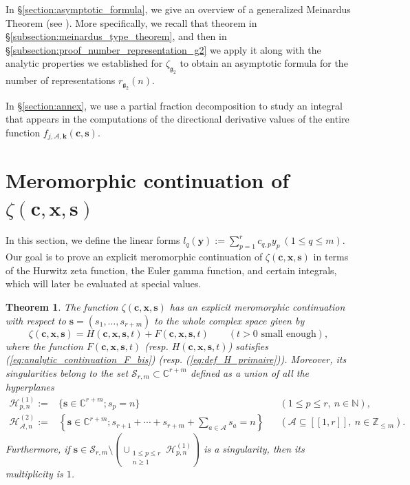 \documentclass[a4paper]{amsart}
\newtheorem{theorem}{Theorem}
\theoremstyle{remark}
\theoremstyle{definition}
\begin{document}
In §\ref{section:asymptotic_formula}, we give an overview of a generalized Meinardus Theorem (see \cite{bridges2024asymptotic}). More specifically, we recall that theorem in §\ref{subsection:meinardus_type_theorem}, and then in §\ref{subsection:proof_number_representation_g2} we apply it along with the analytic properties we established for $\zeta_{\mathfrak{g}_2}$ to obtain an asymptotic formula for the number of representations $r_{\mathfrak{g}_2}(n)$.

In §\ref{section:annex}, we use a partial fraction decomposition to study an integral that appears in the computations of the directional derivative values of the entire function $f_{j,\mathcal{A},\mathbf{k}}(\mathbf{c},\mathbf{s})$.

\section{Meromorphic continuation of \texorpdfstring{$\zeta(\mathbf{c},\mathbf{x},\mathbf{s})$}{zeta}}
\label{section:analytic_continuation_zeta}

In this section, we define the linear forms $l_q(\mathbf{y}):=\sum_{p=1}^r c_{q,p}y_p \ (1 \leq q \leq m)$. Our goal is to prove an explicit meromorphic continuation of $\zeta(\mathbf{c},\mathbf{x},\mathbf{s})$ in terms of the Hurwitz zeta function, the Euler gamma function, and certain integrals, which will later be evaluated at special values.

\begin{theorem}
\label{th:analytic_continuation_zeta}
The function $\zeta(\mathbf{c},\mathbf{x},\mathbf{s})$ has an explicit meromorphic continuation with respect to $\mathbf{s}=(s_1,\ldots,s_{r+m})$ to the whole complex space given by
$$ \zeta(\mathbf{c},\mathbf{x},\mathbf{s})=H(\mathbf{c},\mathbf{x},\mathbf{s},t)+F(\mathbf{c},\mathbf{x},\mathbf{s},t) \qquad (t>0 \text{ small enough}), $$
where the function $F(\mathbf{c},\mathbf{x},\mathbf{s},t)$ (resp. $H(\mathbf{c},\mathbf{x},\mathbf{s},t)$) satisfies (\ref{eq:analytic_continuation_F_bis}) (resp. (\ref{eq:def_H_primaire})). Moreover, its singularities belong to the set $\mathcal{S}_{r,m} \subset \mathbb{C}^{r+m}$ defined as a union of all the hyperplanes
\begin{align*}
    \mathcal{H}^{(1)}_{p,n} :=& \{ \mathbf{s} \in \mathbb{C}^{r+m}; s_{p}=n\} && (1 \leq p \leq r, \ n \in \mathbb{N}), \\
    \mathcal{H}^{(2)}_{\mathcal{A},n} :=& \left\{ \mathbf{s} \in \mathbb{C}^{r+m};s_{r+1}+\cdots+s_{r+m} + \sum_{a \in \mathcal{A}} s_{a}=n\right\} && (\mathcal{A} \subseteq [\![ 1,r ]\!], \ n \in \mathbb{Z}_{\leq m}).
\end{align*}
Furthermore, if $\mathbf{s} \in \mathcal{S}_{r,m} \setminus \left( \cup_{\substack{1 \leq p \leq r \\ n \geq 1}} \mathcal{H}^{(1)}_{p,n}\right)$ is a singularity, then its multiplicity is $1$.
\end{theorem}
\end{document}

